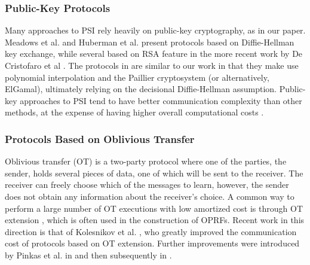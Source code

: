 \subsubsection{Public-Key Protocols}

Many approaches to PSI rely heavily on public-key cryptography, as
in our paper. Meadows et al. \cite{Meadows} and Huberman et al. \cite{Huberman}
present protocols based on Diffie-Hellman key exchange, while several
based on RSA feature in the more recent work by De Cristofaro et al
\cite{DeCristofaro}. The protocols in \cite{Freedman2004,Freedman2016}
are similar to our work in that they make use polynomial interpolation
and the Paillier cryptosystem (or alternatively, ElGamal), ultimately
relying on the decisional Diffie-Hellman assumption. Public-key approaches
to PSI tend to have better communication complexity than other methods,
at the expense of having higher overall computational costs \cite{Pinkas}.

\subsubsection{Protocols Based on Oblivious Transfer}

Oblivious transfer (OT) \cite{Rabin} is a two-party protocol where
one of the parties, the sender, holds several pieces of data, one
of which will be sent to the receiver. The receiver can freely choose
which of the messages to learn, however, the sender does not obtain
any information about the receiver's choice. A common way to perform
a large number of OT executions with low amortized cost is through
OT extension \cite{Pinkas}, which is often used in the construction
of OPRFs. Recent work in this direction is that of Kolesnikov et al.
\cite{Kolesnikov}, who greatly improved the communication cost of protocols
based on OT extension. Further improvements were introduced by Pinkas
et al. in \cite{Pinkas} and then subsequently in \cite{SpOT}.